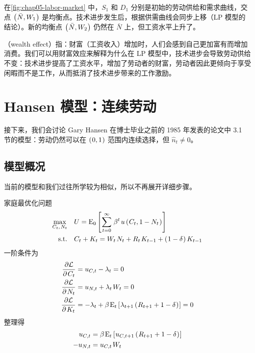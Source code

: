 在\ref{fig:chap05-labor-market} 中，\(S_1\) 和 \(D_1\) 分别是初始的劳动供给和需求曲线，交点 \(\left(\mspace{1mu}\bar N, W_1\mspace{1mu}\right)\) 是均衡点。技术进步发生后，根据供需曲线会同步上移（LP 模型的结论）。新的均衡点 \(\left(\mspace{1mu}\bar N, W_2\mspace{1mu}\right)\) 仍然在 \(\bar N\) 上，但工资水平上升了。

（wealth effect）指：财富（工资收入）增加时，人们会感到自己更加富有而增加消费。我们可以用财富效应来解释为什么在 LP 模型中，技术进步会导致劳动供给不变：技术进步提高了工资水平，增加了劳动者的财富，劳动者因此更倾向于享受闲暇而不是工作，从而抵消了技术进步带来的工作激励。

\section{Hansen 模型：连续劳动}\label{sec:hansen-continuous-labor}

接下来，我们会讨论 Gary Hansen 在博士毕业之前的 1985 年发表的论文中 3.1 节的模型：劳动仍然可以在 \(\left(\mspace{1mu}0,1\mspace{1mu}\right)\) 范围内连续选择，但 \(\hat n_t\ne0\)。


\subsection{模型概况}\label{sec:hansen-continuous-labor-model}

当前的模型和我们过往所学较为相似，所以不再展开详细步骤。

家庭最优化问题
\begin{align*}
    \max_{C_t,\,N_t}\quad & U=\meano\bks{\sum^\infty_{t=0}\,\beta^t\,u\bka{C_t,1-N_t}}\\
    \text{s.t.}\quad & C_t+K_t=W_t\,N_t+R_t\,K_{t-1}+\bka{1-\delta}K\lt
\end{align*}
一阶条件为
\begin{align*}
    \frac{\partial\mathcal{L}}{\p C_t}&=u_{C,t}-\lambda_t=0\\
    \frac{\partial\mathcal{L}}{\p N_t}&=u_{N,t}+\lambda_t\,W_t=0\\
    \frac{\partial\mathcal{L}}{\p K_t}&=-\lambda_t+\beta\,\meant\bks{\lambda_{t+1}\bka{R_{t+1}+1-\delta}}=0
\end{align*}
整理得
\begin{align*}
    u_{C,t}&=\beta\,\meant\bks{u_{C,t+1}\bka{R_{t+1}+1-\delta}}\\
    -u_{N,t}&=u_{C,t}\,W_t
\end{align*}

